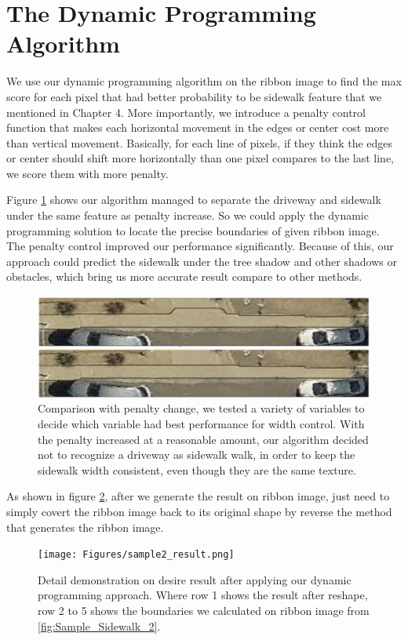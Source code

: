 \section{The Dynamic Programming Algorithm}

We use our dynamic programming algorithm on the ribbon image to find the max score for each pixel that had better probability to be sidewalk feature that we mentioned in Chapter 4. 
More importantly, we introduce a penalty control function that makes each horizontal movement in the edges or center cost more than vertical movement. Basically, for each line of pixels, if they think the edges or center should shift more horizontally than one pixel compares to the last line, we score them with more penalty. 

Figure \ref{fig:penalty} shows our algorithm managed to separate the driveway and sidewalk under the same feature as penalty increase. So we could apply the dynamic programming solution to locate the precise boundaries of given ribbon image. The penalty control improved our performance significantly. Because of this, our approach could predict the sidewalk under the tree shadow and other shadows or obstacles, which bring us more accurate result compare to other methods.
\begin{figure}[H]
    \centering
    \includegraphics[width=\textwidth]{Figures/penalty.png}
    \caption[Penalty Process]{Comparison with penalty change, we tested a variety of variables to decide which variable had best performance for width control. With the penalty increased at a reasonable amount, our algorithm decided not to recognize a driveway as sidewalk walk, in order to keep the sidewalk width consistent, even though they are the same texture.}
    \label{fig:penalty}
\end{figure}

As shown in figure \ref{fig:sample_result2}, after we generate the result on ribbon image, just need to simply covert the ribbon image back to its original shape by reverse the method that generates the ribbon image. 

\begin{figure}[H]
    \centering
    \texttt{[image: Figures/sample2\_result.png]}
    \caption[Desire Output on Sample Sidewalk]{Detail demonstration on desire result after applying our dynamic programming approach. Where row 1 shows the result after reshape, row 2 to 5 shows the boundaries we calculated on ribbon image from \ref{fig:Sample_Sidewalk_2}.}
    \label{fig:sample_result2}
\end{figure}

